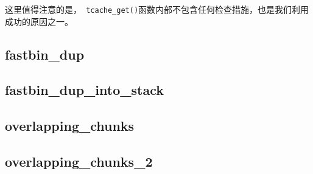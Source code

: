 这里值得注意的是，\verb+ tcache_get()+函数内部不包含任何检查措施，也是我们利用成功的原因之一。

\subsection{fastbin\_dup}

\subsection{fastbin\_dup\_into\_stack}

\subsection{overlapping\_chunks}

\subsection{overlapping\_chunks\_2}

\newpage